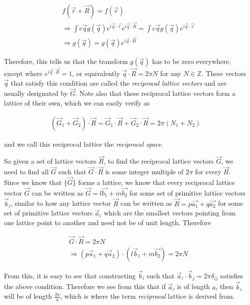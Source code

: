 \begin{align}
  &f(\vec{r}+\vec{R})=f(\vec{r}) \\
  &\Rightarrow\int c\vec{q}g(\vec{q})e^{i\vec{q}\cdot\vec{r}}e^{i\vec{q}\cdot\vec{R}}=\int c\vec{q}g(\vec{q})e^{i\vec{q}\cdot\vec{r}} \\
  &\Rightarrow g(\vec{q})=g(\vec{q})e^{i\vec{q}\cdot\vec{R}}
\label{eq:fg}
\end{align}

Therefore, this tells us that the transform $g(\vec{q})$ has to be zero
everywhere, except where $e^{i\vec{q}\cdot\vec{R}}=1$, or equivalently
$\vec{q}\cdot\vec{R}=2\pi N$ for any $N\in \mathbb{Z}$. These vectors $\vec{q}$ that
satisfy this condition are called the \textit{reciprocal lattice vectors} and
are usually designated by $\vec{G}$. Note also that these reciprocal lattice
vectors form a lattice of their own, which we can easily verify as

\begin{align}
(\vec{G}_1+\vec{G}_2)\cdot\vec{R}=\vec{G}_1\cdot\vec{R}+\vec{G}_2\cdot\vec{R}=2\pi (N_1+N_2)
\end{align}
 
and we call this reciprocal lattice the \textit{reciprocal space}.

So given a set of lattice vectors $\vec{R}$, to find the reciprocal lattice
vectors $\vec{G}$, we need to find all $\vec{G}$ such that
$\vec{G}\cdot\vec{R}$ is some integer multiple of $2\pi$ for every $\vec{R}$.
Since we know that $\{\vec{G}\}$ forms a lattice, we know that every reciprocal
lattice vector $\vec{G}$ can be written as $\vec{G}=l\vec{b_1}+m\vec{b_2}$ for
some set of primitive lattice vectors $\vec{b}_i$, similar to how any lattice
vector $\vec{R}$ can be written as $\vec{R}=p\vec{a_1}+q\vec{a_2}$ for some set
of primitive lattice vectors $\vec{a}_i$ which are the smallest vectors
pointing from one lattice point to another and need not be of unit length.
Therefore 

\begin{align}
  &\vec{G}\cdot\vec{R}=2\pi N \\
  &\Rightarrow (p\vec{a}_1+q\vec{a}_2)\cdot(l\vec{b}_1+m\vec{b_2})=2\pi N
\end{align}

From this, it is easy to see that constructing $\vec{b}_i$ such that
$\vec{a}_i\cdot\vec{b}_j=2\pi\delta_{ij}$ satisfies the above condition.
Therefore we see from this that if $\vec{a}_i$ is of length $a$, then
$\vec{b}_i$ will be of length $\frac{2\pi}{a}$, which is where the term
\textit{reciprocal} lattice is derived from.

